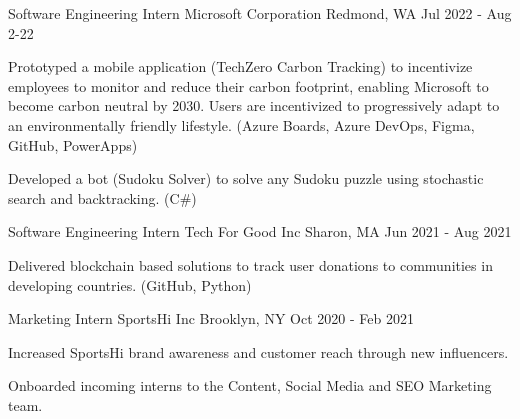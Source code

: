 

\begin{cventries}

  \cventry
    {Software Engineering Intern} %
    {Microsoft Corporation} %
    {Redmond, WA} %
    {Jul 2022 - Aug 2-22} %
    {
      \begin{cvitems} %
        \item {Prototyped a mobile application (TechZero Carbon Tracking) to incentivize employees to monitor and reduce their carbon footprint, enabling Microsoft to become carbon neutral by 2030. Users are incentivized to progressively adapt to an environmentally friendly lifestyle. (Azure Boards, Azure DevOps, Figma, GitHub, PowerApps)}
        \item {Developed a bot (Sudoku Solver) to solve any Sudoku puzzle using stochastic search and backtracking. (C#)}
        \end{cvitems}
    }

  \cventry
    {Software Engineering Intern} %
    {Tech For Good Inc} %
    {Sharon, MA} %
    {Jun 2021 - Aug 2021} %
    {
      \begin{cvitems} %
        \item {Delivered blockchain based solutions to track user donations to communities in developing countries. (GitHub, Python)}
      \end{cvitems}
    }

  \cventry
    {Marketing Intern} %
    {SportsHi Inc} %
    {Brooklyn, NY} %
    {Oct 2020 - Feb 2021} %
    {
      \begin{cvitems} %
        \item {Increased SportsHi brand awareness and customer reach through new influencers.}
        \item {Onboarded incoming interns to the Content, Social Media and SEO Marketing team.}
      \end{cvitems}
    }

\end{cventries}
